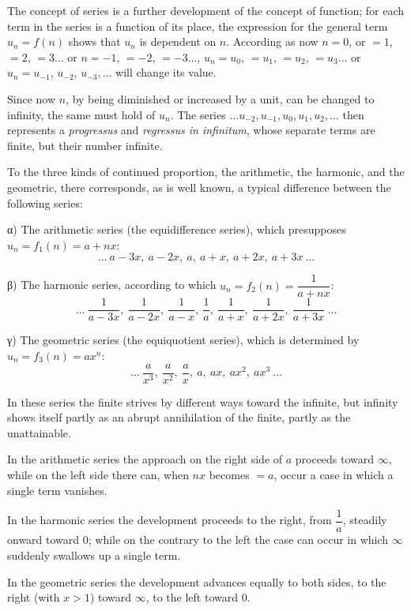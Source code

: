 \documentclass[12pt]{book}
\begin{document}
The concept of series is a further development of the concept of function; for each
term in the series is a function of its place, the expression for the general term
$u_n = f(n)$ shows that $u_n$ is dependent on $n$. According as now $n = 0$, or
$= 1$, $= 2$, $= 3\dots$ or $n = -1$, $= -2$, $= -3\dots$, $u_n = u_0$, $= u_1$,
$= u_2$, $= u_3\dots$ or $u_n = u_{-1}$, $u_{-2}$, $u_{-3},\dots$ will change its
value.

Since now $n$, by being diminished or increased by a unit, can be changed to
infinity, the same must hold of $u_n$. The series $\dots u_{-2}, u_{-1}, u_0, u_1,
u_2, \dots$ then represents a \textit{progressus} and \textit{regressus in
infinitum}, whose separate terms are finite, but their number infinite.

To the three kinds of continued proportion, the arithmetic, the harmonic, and the
geometric, there corresponds, as is well known, a typical difference between the
following series:

α) The arithmetic series (the equidifference series), which presupposes
$u_n = f_1(n) = a + nx$:
\[
\dots\ a-3x,\ a-2x,\ a,\ a+x,\ a+2x,\ a+3x\ \dots
\]

β) The harmonic series, according to which $u_n = f_2(n) = \dfrac{1}{a+nx}$:
\[
\dots\ \frac{1}{a-3x},\ \frac{1}{a-2x},\ \frac{1}{a-x},\ \frac{1}{a},\
\frac{1}{a+x},\ \frac{1}{a+2x},\ \frac{1}{a+3x}\ \dots
\]

γ) The geometric series (the equiquotient series), which is determined by
$u_n = f_3(n) = ax^{n}$:
\[
\dots\ \frac{a}{x^{3}},\ \frac{a}{x^{2}},\ \frac{a}{x},\ a,\ ax,\ ax^{2},\
ax^{3}\ \dots
\]

In these series the finite strives by different ways toward the infinite, but
infinity shows itself partly as an abrupt annihilation of the finite, partly as
the unattainable.

In the arithmetic series the approach on the right side of $a$ proceeds toward
$\infty$, while on the left side there can, when $nx$ becomes $= a$, occur a case
in which a single term vanishes.

In the harmonic series the development proceeds to the right, from $\dfrac{1}{a}$,
steadily onward toward $0$; while on the contrary to the left the case can occur
in which $\infty$ suddenly swallows up a single term.

In the geometric series the development advances equally to both sides, to the
right (with $x > 1$) toward $\infty$, to the left toward $0$.
\end{document}
